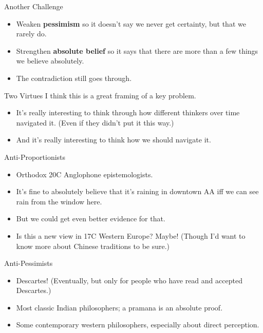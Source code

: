 \documentclass[
  17pt,
  letterpaper,
  ignorenonframetext,
  aspectratio=169,
]{beamer}
\providecommand{\tightlist}{%
  \setlength{\itemsep}{0pt}\setlength{\parskip}{0pt}}\usepackage{longtable,booktabs,array}
\begin{document}
\begin{frame}{Another Challenge}
\protect\hypertarget{another-challenge}{}
\begin{itemize}[<+->]
\tightlist
\item
  Weaken \textbf{pessimism} so it doesn't say we never get certainty,
  but that we rarely do.
\item
  Strengthen \textbf{absolute belief} so it says that there are more
  than a few things we believe absolutely.
\item
  The contradiction still goes through.
\end{itemize}
\end{frame}

\begin{frame}{Two Virtues}
\protect\hypertarget{two-virtues}{}
I think this is a great framing of a key problem.

\begin{itemize}[<+->]
\tightlist
\item
  It's really interesting to think through how different thinkers over
  time navigated it. (Even if they didn't put it this way.)
\item
  And it's really interesting to think how we should navigate it.
\end{itemize}
\end{frame}

\begin{frame}{Anti-Proportionists}
\protect\hypertarget{anti-proportionists}{}
\begin{itemize}[<+->]
\tightlist
\item
  Orthodox 20C Anglophone epistemologists.
\item
  It's fine to absolutely believe that it's raining in downtown AA iff
  we can see rain from the window here.
\item
  But we could get even better evidence for that.
\item
  Is this a new view in 17C Western Europe? Maybe! (Though I'd want to
  know more about Chinese traditions to be sure.)
\end{itemize}
\end{frame}

\begin{frame}{Anti-Pessimists}
\protect\hypertarget{anti-pessimists}{}
\begin{itemize}[<+->]
\tightlist
\item
  Descartes! (Eventually, but only for people who have read and accepted
  Descartes.)
\item
  Most classic Indian philosophers; a pramana is an absolute proof.
\item
  Some contemporary western philosophers, especially about direct
  perception.
\end{itemize}
\end{frame}
\end{document}
